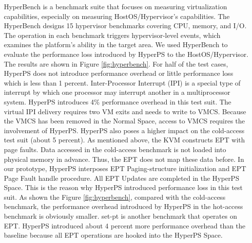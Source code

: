 HyperBench is a benchmark suite that focuses on measuring virtualization capabilities, especially on measuring HostOS/Hypervisor's capabilities. 
The HyperBench designs 15 hypervisor benchmarks covering CPU, memory, and I/O. The operation in each benchmark triggers hypervisor-level events, which examines the platform's ability in the target area. We used HyperBench to evaluate the performance loss introduced by HyperPS to the HostOS/Hypervisor.
The results are shown in Figure \ref{fig:hyperbench}. For half of the test cases, HyperPS does not introduce performance overhead or little performance loss which is less than 1 percent. 
Inter-Processor Interrupt (IPI) is a special type of interrupt by which one processor may interrupt another in a multiprocessor system. 
HyperPS introduces 4\% performance overhead in this test suit. 
The virtual IPI delivery requires two VM exits and needs to write to VMCS. Because the VMCS has been removed in the Normal Space, access to VMCS requires the involvement of HyperPS.  
HyperPS also poses a higher impact on the cold-access test suit (about 5 percent). 
As mentioned above, the KVM constructs EPT with page faults. Data accessed in the cold-access benchmark is not loaded into physical memory in advance. Thus, the EPT does not map these data before. In our prototype, HyperPS interposes EPT Paging-structure initialization and EPT Page Fault handle procedure. 
All EPT Updates are completed in the HyperPS Space. This is the reason why HyperPS introduced performance loss in this test suit. 
As shown the Figure \ref{fig:hyperbench}, compared with the cold-access benchmark, the performance overhead introduced by HyperPS in the hot-access benchmark is obviously smaller. 
set-pt is another benchmark that operates on EPT. HyperPS introduced about 4 percent more performance overhead than the baseline because all EPT operations are hooked into the HyperPS Space. 


